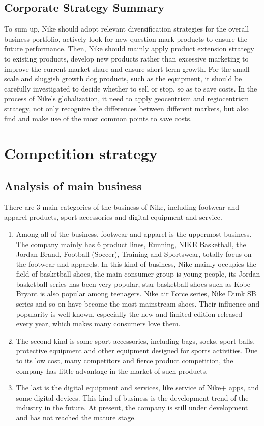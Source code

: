 \documentclass[a4paper, 12pt]{report}
\begin{document}
\subsection{Corporate Strategy Summary}
To sum up, Nike should adopt relevant diversification strategies for the overall business portfolio, actively look for new question mark products to ensure the future performance. Then, Nike should mainly apply product extension strategy to existing products, develop new products rather than excessive marketing to improve the current market share and ensure short-term growth. For the small-scale and sluggish growth dog products, such as the equipment, it should be carefully investigated to decide whether to sell or stop, so as to save costs. In the process of Nike's globalization, it need to apply geocentrism and regiocentrism strategy, not only recognize the differences between different markets, but also find and make use of the most common points to save costs.
\section{Competition strategy}

\subsection{Analysis of main business}
There are 3 main categories of the business of Nike, including footwear and apparel products, sport accessories and digital equipment and service. 
\begin{enumerate}
    \item Among all of the business, footwear and apparel is the uppermost business. The company mainly has 6 product lines, Running, NIKE Basketball, the Jordan Brand, Football (Soccer), Training and Sportswear, totally focus on the footwear and apparels. In this kind of business, Nike mainly occupies the field of basketball shoes, the main consumer group is young people, its Jordan basketball series has been very popular, star basketball shoes such as Kobe Bryant is also popular among teenagers. Nike air Force series, Nike Dunk SB series and so on have become the most mainstream shoes. Their influence and popularity is well-known, especially the new and limited edition released every year, which makes many consumers love them.

    \item The second kind is some sport accessories, including bags, socks, sport balls, protective equipment and other equipment designed for sports activities. Due to its low cost, many competitors and fierce product competition, the company has little advantage in the market of such products.
    \item The last is the digital equipment and services, like service of Nike+ apps, and some digital devices. This kind of business is the development trend of the industry in the future. At present, the company is still under development and has not reached the mature stage.
\end{enumerate}
\end{document}
